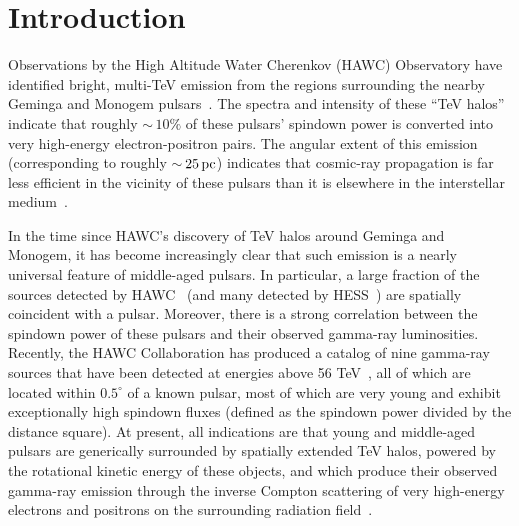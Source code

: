 \documentclass[aps,prd,twocolumn,amsmath,superscriptaddress,amssymb,showpacs,floatfix,nofootinbib,longbibliography,preprintnumbers]{revtex4-1}
\begin{document}
\section{Introduction}



Observations by the High Altitude Water Cherenkov (HAWC) Observatory have identified bright, multi-TeV emission from the regions surrounding the nearby Geminga and Monogem pulsars~\cite{Albert:2020fua,Abeysekara:2017hyn,Abeysekara:2017old,Abdo:2009ku}. The spectra and intensity of these ``TeV halos'' indicate that roughly $\sim$\,$10\%$ of these pulsars' spindown power is converted into very high-energy electron-positron pairs. The angular extent of this emission (corresponding to roughly $\sim$\,$25 \,{\rm pc}$) indicates that cosmic-ray propagation is far less efficient in the vicinity of these pulsars than it is elsewhere in the interstellar medium~\cite{Hooper:2017gtd,Hooper:2017tkg,Johannesson:2019jlk,DiMauro:2019hwn,Liu:2019zyj}. 

In the time since HAWC's discovery of TeV halos around Geminga and Monogem, it has become increasingly clear that such emission is a nearly universal feature of middle-aged pulsars. In particular, a large fraction of the sources detected by HAWC~\cite{Albert:2020fua,Abeysekara:2017hyn,Smith:2020clm, Albert:2021vrd} (and many detected by HESS~\cite{H.E.S.S.:2018zkf,Abdalla:2017vci}) are spatially coincident with a pulsar. Moreover, there is a strong correlation between the spindown power of these pulsars and their observed gamma-ray luminosities. Recently, the HAWC Collaboration has produced a catalog of nine gamma-ray sources that have been detected at energies above 56 TeV~\cite{Abeysekara:2019gov}, all of which are located within $0.5^{\circ}$ of a known pulsar, most of which are very young and exhibit exceptionally high spindown fluxes (defined as the spindown power divided by the distance square). At present, all indications are that young and middle-aged pulsars are generically surrounded by spatially extended TeV halos, powered by the rotational kinetic energy of these objects, and which produce their observed gamma-ray emission through the inverse Compton scattering of very high-energy electrons and positrons on the surrounding radiation field~\cite{Linden:2017vvb,Sudoh:2019lav,Sudoh:2021avj}.
\end{document}
